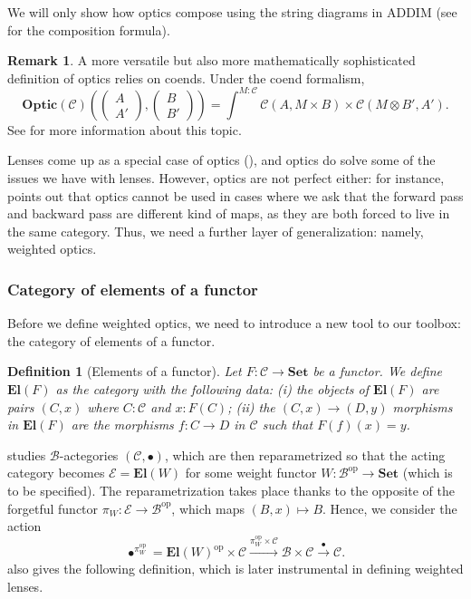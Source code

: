 \documentclass[12pt,a4paper,openright,twoside]{report}
\theoremstyle{plain}
\newtheorem{definition}[proposition]{Definition}
\theoremstyle{definition}
\newtheorem{remark}[proposition]{Remark}
\begin{document}
We will only show how optics compose using the string diagrams in ADDIM (see \cite{riley2018categories} for the composition formula).

\begin{remark}
  A more versatile but also more mathematically sophisticated definition of optics relies on coends. Under the coend formalism,
  \[\mathbf{Optic}(\mathcal{C})\left(\left(\begin{smallmatrix} A \\ A' \end{smallmatrix}\right),\left(\begin{smallmatrix} B \\ B' \end{smallmatrix}\right)\right) = \int^{M : \mathcal{C}}\mathcal{C}(A,M \times B) \times \mathcal{C}(M \otimes B',A').\] 
  See \cite{riley2018categories} for more information about this topic.
\end{remark}

Lenses come up as a special case of optics (\cite{riley2018categories}), and optics do solve some of the issues we have with lenses. However, optics are not perfect either: for instance, \cite{gavranovic2024fundamental} points out that optics cannot be used in cases where we ask that the forward pass and backward pass are different kind of maps, as they are both forced to live in the same category. Thus, we need a further layer of generalization: namely, weighted optics.



\subsubsection{Category of elements of a functor}

Before we define weighted optics, we need to introduce a new tool to our toolbox: the category of elements of a functor.

\begin{definition}[Elements of a functor]
  Let $F: \mathcal{C} \to \mathbf{Set}$ be a functor. We define $\mathbf{El}(F)$ as the category with the following data: (i) the objects of $\mathbf{El}(F)$ are pairs $(C, x)$ where $C : \mathcal{C}$ and $x : F(C)$; (ii) the $(C, x) \to (D, y)$ morphisms in $\mathbf{El}(F)$ are the morphisms $f: C \to D$ in $\mathcal{C}$ such that $F(f)(x) = y$.
\end{definition}

\cite{gavranovic2024fundamental} studies $\mathcal{B}$-actegories $(\mathcal{C}, \bullet)$, which are then reparametrized so that the acting category becomes $\mathcal{E} = \mathbf{El}(W)$ for some weight functor $W: \mathcal{B}^{\mathrm{op}} \to \mathbf{Set}$ (which is to be specified). The reparametrization takes place thanks to the opposite of the forgetful functor $\pi_W: \mathcal{E} \to \mathcal{B}^{\mathrm{op}}$, which maps $(B,x) \mapsto B$. Hence, we consider the action
\[\bullet^{\pi_W^{\mathrm{op}}} = \mathbf{El}(W)^{\mathrm{op}} \times \mathcal{C} \stackrel{\pi_W^{\mathrm{op}} \times \mathcal{C}}{\longrightarrow} \mathcal{B} \times \mathcal{C} \stackrel{\bullet}{\longrightarrow} \mathcal{C}.\]
\cite{gavranovic2024fundamental} also gives the following definition, which is later instrumental in defining weighted lenses.
\end{document}
